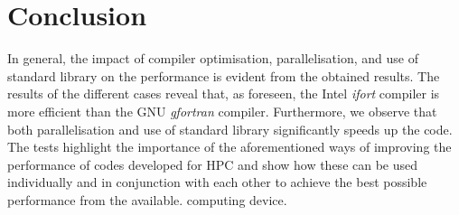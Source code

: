 \documentclass[11pt, oneside]{article}   	%
\begin{document}
\section{Conclusion}
In general, the impact of compiler optimisation, parallelisation, and use of standard library on the performance is evident from the obtained results. The results of the different cases reveal that, as foreseen, the Intel \textit{ifort} compiler is more efficient than the GNU \textit{gfortran} compiler. Furthermore, we observe that both parallelisation and use of standard library significantly speeds up the code. The tests highlight the importance of the aforementioned ways of improving the performance of codes developed for HPC and show how these can be used individually and in conjunction with each other to achieve the best possible performance from the available. computing device. 



\end{document}

